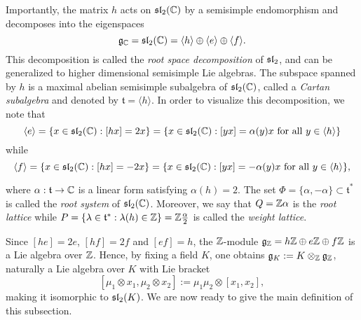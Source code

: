 Importantly, the matrix $h$ acts on $\mathfrak{sl}_2(\mathbb{C})$ by a semisimple endomorphism and decomposes into the eigenspaces 
$$\mathfrak{g}_{\mathbb{C}}=\mathfrak{sl}_2(\mathbb{C})=\langle h\rangle\oplus\langle e\rangle\oplus\langle f\rangle.$$
This decomposition is called the \textit{root space decomposition} of $\mathfrak{sl}_2$, and can be generalized to higher dimensional semisimple Lie algebras. The subspace spanned by $h$ is a maximal abelian semisimple subalgebra of $\mathfrak{sl}_2(\mathbb{C})$, called a \textit{Cartan subalgebra} and denoted by $\mathfrak{t}=\langle h \rangle$.
In order to visualize this decomposition, we note that $$\langle e\rangle=\{x\in\mathfrak{sl}_2(\mathbb{C}):[hx]=2x\}=\{x\in\mathfrak{sl}_2(\mathbb{C}):[yx]=\alpha(y)x\text{ for all }y\in\langle h\rangle\}$$ while $$\langle f\rangle=\{x\in\mathfrak{sl}_2(\mathbb{C}):[hx]=-2x\}=\{x\in\mathfrak{sl}_2(\mathbb{C}):[yx]=-\alpha(y)x\text{ for all }y\in\langle h\rangle\},$$

\iffalse This motivates the following rather technical definition, central to Lie theory.
\begin{definition}
    Let $\fg$ be a complex Lie algebra and let $\mathfrak{t}$ be a Cartan subalgebra 
\end{definition}\fi


where $\alpha:\mathfrak{t}\to\mathbb{C}$ is a linear form satisfying $\alpha(h)=2$. The set $\Phi=\{\alpha,-\alpha\}\subset\mathfrak{t}^*$ is called the \textit{root system} of $\mathfrak{sl}_2(\mathbb{C})$. Moreover, we say that $Q=\mathbb{Z}\alpha$ is the \textit{root lattice} while $P=\{\lambda\in\mathfrak{t}^*:\lambda(h)\in\mathbb{Z}\}=\mathbb{Z}\frac{\alpha}{2}$ is called the \textit{weight lattice}.

Since $[he]=2e$, $[hf]=2f$ and $[ef]=h$, the $\mathbb{Z}$-module $\mathfrak{g}_{\mathbb{Z}}=h\mathbb{Z}\oplus e\mathbb{Z}\oplus f\mathbb{Z}$ is a Lie algebra over $\mathbb{Z}$. Hence, by fixing a field $K$, one obtains $\mathfrak{g}_K:=K\otimes_{\mathbb{Z}}\mathfrak{g}_{\mathbb{Z}}$, naturally a Lie algebra over $K$ with Lie bracket
$$[\mu_1\otimes x_1,\mu_2\otimes x_2]:=\mu_1\mu_2\otimes[x_1,x_2],$$
making it isomorphic to $\mathfrak{sl}_2(K)$. We are now ready to give the main definition of this subsection.

